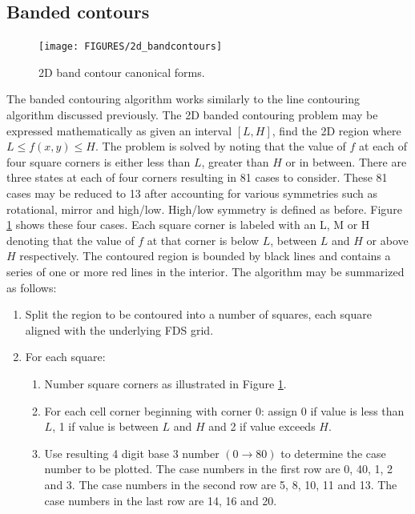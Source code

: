 \documentclass[11pt,twoside]{book}
\newcommand{\figoptions}{htp}
\begin{document}
\subsection{Banded contours}
\begin{figure}[\figoptions]
\begin{center}
\texttt{[image: FIGURES/2d\_bandcontours]}
\end{center}
\caption{2D band contour canonical forms.
  }
\label{fig2dband}%
\end{figure}
The banded contouring algorithm works similarly to the line
contouring algorithm discussed previously.  The 2D banded
contouring problem may be expressed mathematically as given an
interval $[L,H]$, find the 2D region where $L\le f(x,y)\le H$. The
problem is solved by noting that the value of $f$ at each of four
square corners is either less than $L$, greater than $H$ or in
between.  There are three states at each of four corners resulting
in 81 cases to consider.  These 81 cases may be reduced to 13
after accounting for various symmetries such as rotational, mirror
and high/low. High/low symmetry is defined as before. Figure
\ref{fig2dband} shows these four cases.  Each square corner is
labeled with an L, M or H denoting that the value of $f$ at that
corner is below $L$, between $L$  and $H$ or above $H$
respectively.  The contoured region is bounded by black lines and
contains a series of one or more red lines in the interior. The
algorithm may be summarized as follows:
\begin{enumerate}
\item Split the region to be contoured into a number of squares, each square aligned with the underlying FDS grid.
\item For  each square:
\begin{enumerate}
\item Number square corners as illustrated in Figure \ref{fig2dband}.
\item For each cell corner beginning with corner 0: assign 0 if value is less than $L$, 1 if value is between $L$ and $H$ and 2 if value exceeds $H$.
\item Use resulting 4 digit base 3 number $(0\rightarrow 80)$ to determine the case number to be plotted.
The case numbers in the first row are 0, 40, 1, 2 and 3.  The case numbers in the second row are 5, 8, 10, 11 and 13.  The case numbers in the last row are 14, 16 and 20.
\end{enumerate}
\end{enumerate}
\end{document}
